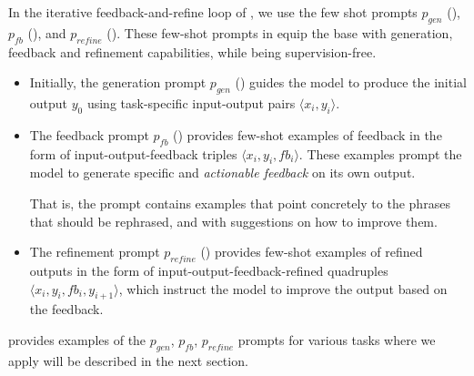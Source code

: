 In the iterative feedback-and-refine loop of \ours, we use the few shot prompts $p_{gen}$ (), $p_{fb}$ (), and $p_{refine}$ (). These few-shot prompts in \ours equip the base \llm with generation, feedback and refinement capabilities, while being supervision-free.


\begin{itemize}
    \item[$p_{gen}$:] Initially, the generation prompt $p_{gen}$ () guides the model to  produce the initial output $y_0$ using task-specific input-output pairs $\langle x_i, y_i \rangle$. 
    
    \item[$p_{fb}$:] The feedback prompt $p_{fb}$ () provides few-shot examples of feedback in the form of input-output-feedback triples $\langle x_i, y_i, fb_i \rangle$. These examples prompt the model to generate specific and \textit{actionable feedback} on its own output.

    That is, the prompt contains examples that point concretely to the phrases that should be rephrased, and with suggestions on how to improve them.
    
    \item[$p_{refine}$:] The refinement prompt $p_{refine}$ () provides few-shot examples of refined outputs in the form of input-output-feedback-refined quadruples $\langle x_i, y_i, fb_i, y_{i+1} \rangle$, which instruct the model to improve the output based on the feedback.
\end{itemize}
 provides examples of the $p_{gen}$, $p_{fb}$, $p_{refine}$ prompts for various tasks where we apply \ours will be described in the next section. 
\fi